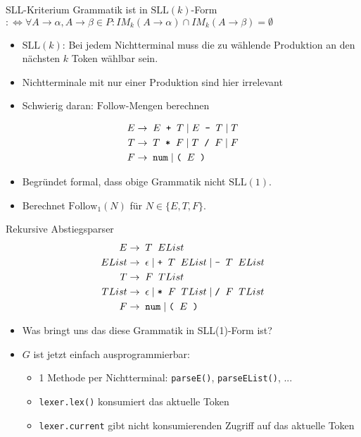 \documentclass{beamer}
\begin{document}
\begin{frame}{SLL-Kriterium}
	Grammatik ist in $\textrm{SLL}(k)$-Form\\
	$:\Leftrightarrow \forall A \to \alpha, A \to \beta \in P: IM_k(A \to \alpha) \cap IM_k(A \to \beta) = \emptyset$

	\begin{itemize}
		\item $\textrm{SLL}(k)$: Bei jedem Nichtterminal muss die zu wählende Produktion an den nächsten $k$ Token wählbar sein.
		\item Nichtterminale mit nur einer Produktion sind hier irrelevant
		\item Schwierig daran: $\textrm{Follow}$-Mengen berechnen
	\end{itemize}
	\pause
	\begin{align*}
		E \to & \;\; E \;\; \textrm{\texttt{+}} \;\; T \mid E \;\; \textrm{\texttt{-}} \;\; T \mid T\\
		T \to & \;\; T \;\; \textrm{\texttt{*}} \;\; F \mid T \;\; \textrm{\texttt{/}} \;\; F \mid F\\
		F \to & \;\; \textrm{\texttt{num}} \; | \; \textrm{\texttt{(}} \;\; E \;\; \textrm{\texttt{)}}
	\end{align*}
	
	\begin{itemize}
		\item Begründet formal, dass obige Grammatik nicht $\textrm{SLL}(1)$.
		\item Berechnet $\textrm{Follow}_1(N)$ für $N \in \{ E, T, F \}$.
	\end{itemize}
\end{frame}

\begin{frame}{Rekursive Abstiegsparser}
	\footnotesize
	\begin{align*}
		E     \to & \;\; T \;\; EList\\
		EList \to & \;\; \epsilon \mid \textrm{\texttt{+}} \;\; T \;\; EList \mid \textrm{\texttt{-}} \;\; T \;\; EList\\
		T     \to & \;\; F \;\; TList\\
		TList \to & \;\; \epsilon \mid \textrm{\texttt{*}} \;\; F \;\; TList \mid \textrm{\texttt{/}} \;\; F \;\; TList\\
		F \to & \;\; \textrm{\texttt{num}} \; | \; \textrm{\texttt{(}} \;\; E \;\; \textrm{\texttt{)}}
	\end{align*}
	\begin{itemize}
            \pause
            \item Was bringt uns das diese Grammatik in SLL(1)-Form ist?
            \pause
		\item $G$ ist jetzt einfach ausprogrammierbar:
		\begin{itemize}
			\item 1 Methode per Nichtterminal: \texttt{parseE()}, \texttt{parseEList()}, ...
			\item \texttt{lexer.lex()} konsumiert das aktuelle Token
			\item \texttt{lexer.current} gibt nicht konsumierenden Zugriff auf das aktuelle Token
		\end{itemize}
	\end{itemize}
\end{frame}
\end{document}
